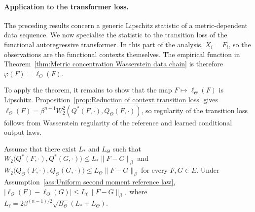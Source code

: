 \paragraph{Application to the transformer loss.}

The preceding results concern a generic Lipschitz statistic of a metric-dependent data sequence. We now specialise the statistic to the transition loss of the functional autoregressive transformer. In this part of the analysis, \(X_i=F_i\), so the observations are the functional contexts themselves. The empirical function in Theorem~\ref{thm:Metric concentration Wasserstein data chain} is therefore \(\varphi(F)=\ell_\Theta(F)\).

To apply the theorem, it remains to show that the map \(F\mapsto\ell_\Theta(F)\) is Lipschitz. Proposition~\ref{prop:Reduction of context transition loss} gives \(\ell_\Theta(F)=\beta^{n-1}W_2^2(Q^*(F,\cdot),Q_\Theta(F,\cdot))\), so regularity of the transition loss follows from Wasserstein regularity of the reference and learned conditional output laws.

\begin{proposition}
\label{prop:Lipschitz continuity squared Wasserstein loss}
Assume that there exist \(L_*\) and \(L_\Theta\) such that
\(
W_2
\bigl(
Q^*(F,\cdot),
Q^*(G,\cdot)
\bigr)
\leqslant
L_*
\|F-G\|_\beta
\)
and
\(
W_2
\bigl(
Q_\Theta(F,\cdot),
Q_\Theta(G,\cdot)
\bigr)
\leqslant
L_\Theta
\|F-G\|_\beta
\)
for every \(F,G\in E\). Under Assumption~\ref{ass:Uniform second moment reference law},
\(
|\ell_\Theta(F)-\ell_\Theta(G)|
\leqslant
L_\ell
\|F-G\|_\beta,
\)
where
\(
L_\ell
=
2
\beta^{(n-1)/2}
\sqrt{B_\Theta}
(L_*+L_\Theta).
\)
\end{proposition}

